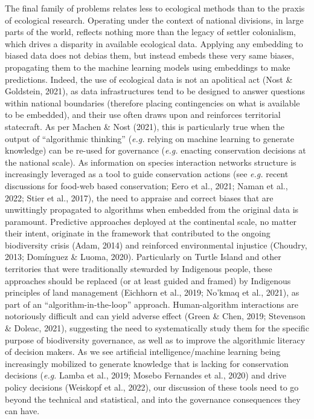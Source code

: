 \documentclass[11pt]{article}
\begin{document}
The final family of problems relates less to ecological methods than to
the praxis of ecological research. Operating under the context of
national divisions, in large parts of the world, reflects nothing more
than the legacy of settler colonialism, which drives a disparity in
available ecological data. Applying any embedding to biased data does
not debias them, but instead embeds these very same biases, propagating
them to the machine learning models using embeddings to make
predictions. Indeed, the use of ecological data is not an apolitical act
(Nost \& Goldstein, 2021), as data infrastructures tend to be designed
to answer questions within national boundaries (therefore placing
contingencies on what is available to be embedded), and their use often
draws upon and reinforces territorial statecraft. As per Machen \& Nost
(2021), this is particularly true when the output of ``algorithmic
thinking'' (\emph{e.g.} relying on machine learning to generate
knowledge) can be re-used for governance (\emph{e.g.} enacting
conservation decisions at the national scale). As information on species
interaction networks structure is increasingly leveraged as a tool to
guide conservation actions (see \emph{e.g.} recent discussions for
food-web based conservation; Eero et al., 2021; Naman et al., 2022;
Stier et al., 2017), the need to appraise and correct biases that are
unwittingly propagated to algorithms when embedded from the original
data is paramount. Predictive approaches deployed at the continental
scale, no matter their intent, originate in the framework that
contributed to the ongoing biodiversity crisis (Adam, 2014) and
reinforced environmental injustice (Choudry, 2013; Domínguez \& Luoma,
2020). Particularly on Turtle Island and other territories that were
traditionally stewarded by Indigenous people, these approaches should be
replaced (or at least guided and framed) by Indigenous principles of
land management (Eichhorn et al., 2019; No'kmaq et al., 2021), as part
of an ``algorithm-in-the-loop'' approach. Human-algorithm interactions
are notoriously difficult and can yield adverse effect (Green \& Chen,
2019; Stevenson \& Doleac, 2021), suggesting the need to systematically
study them for the specific purpose of biodiversity governance, as well
as to improve the algorithmic literacy of decision makers. As we see
artificial intelligence/machine learning being increasingly mobilized to
generate knowledge that is lacking for conservation decisions
(\emph{e.g.} Lamba et al., 2019; Mosebo Fernandes et al., 2020) and
drive policy decisions (Weiskopf et al., 2022), our discussion of these
tools need to go beyond the technical and statistical, and into the
governance consequences they can have.
\end{document}
